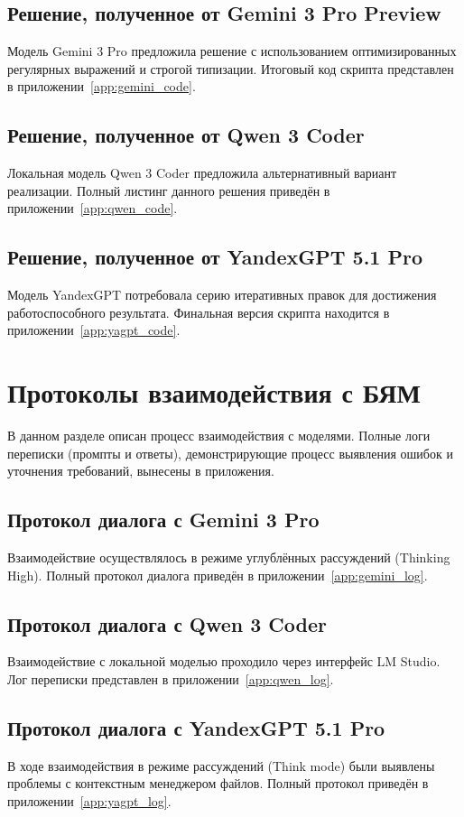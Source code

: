 \subsection{Решение, полученное от Gemini 3 Pro Preview}
Модель Gemini 3 Pro предложила решение с использованием оптимизированных регулярных выражений и строгой типизации. Итоговый код скрипта представлен в приложении~\ref{app:gemini_code}.

\subsection{Решение, полученное от Qwen 3 Coder}
Локальная модель Qwen 3 Coder предложила альтернативный вариант реализации. Полный листинг данного решения приведён в приложении~\ref{app:qwen_code}.

\subsection{Решение, полученное от YandexGPT 5.1 Pro}
Модель YandexGPT потребовала серию итеративных правок для достижения работоспособного результата. Финальная версия скрипта находится в приложении~\ref{app:yagpt_code}.

\section{Протоколы взаимодействия с БЯМ}

В данном разделе описан процесс взаимодействия с моделями. Полные логи переписки (промпты и ответы), демонстрирующие процесс выявления ошибок и уточнения требований, вынесены в приложения.

\subsection{Протокол диалога с Gemini 3 Pro}
Взаимодействие осуществлялось в режиме углублённых рассуждений (Thinking High). Полный протокол диалога приведён в приложении~\ref{app:gemini_log}.

\subsection{Протокол диалога с Qwen 3 Coder}
Взаимодействие с локальной моделью проходило через интерфейс LM Studio. Лог переписки представлен в приложении~\ref{app:qwen_log}.

\subsection{Протокол диалога с YandexGPT 5.1 Pro}
В ходе взаимодействия в режиме рассуждений (Think mode) были выявлены проблемы с контекстным менеджером файлов. Полный протокол приведён в приложении~\ref{app:yagpt_log}.

\clearpage